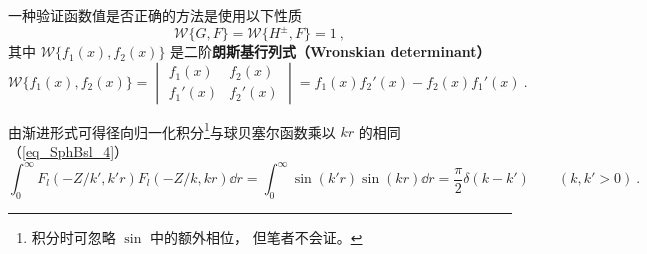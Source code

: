 一种验证函数值是否正确的方法是使用以下性质
\begin{equation}
\mathcal{W}\{G, F\} = \mathcal{W}\{H^\pm, F\} = 1~,
\end{equation}
其中 $\mathcal{W}\{f_1(x), f_2(x)\}$ 是二阶\textbf{朗斯基行列式（Wronskian determinant）}
\begin{equation}
\mathcal{W}\{f_1(x), f_2(x)\} = \begin{vmatrix}
f_1(x)  & f_2(x) \\
f_1'(x) & f_2'(x)
\end{vmatrix} = f_1(x) f_2'(x) - f_2(x) f_1'(x)~.
\end{equation}


由渐进形式可得径向归一化积分\footnote{积分时可忽略 $\sin$ 中的额外相位， 但笔者不会证。}与球贝塞尔函数乘以 $kr$ 的相同（\autoref{eq_SphBsl_4}）
\begin{equation}
\int_0^\infty F_l(-Z/k', k' r)F_l(-Z/k, kr) \dd{r} = \int_0^\infty \sin(k'r)\sin(kr) \dd{r} = \frac{\pi}{2}\delta(k - k') \qquad (k, k' > 0)~.
\end{equation}
